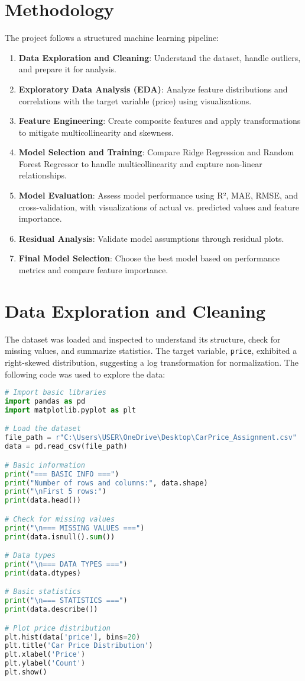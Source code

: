 \documentclass[12pt]{article}
\begin{document}
\section{Methodology}
The project follows a structured machine learning pipeline:
\begin{enumerate}
    \item \textbf{Data Exploration and Cleaning}: Understand the dataset, handle outliers, and prepare it for analysis.
    \item \textbf{Exploratory Data Analysis (EDA)}: Analyze feature distributions and correlations with the target variable (price) using visualizations.
    \item \textbf{Feature Engineering}: Create composite features and apply transformations to mitigate multicollinearity and skewness.
    \item \textbf{Model Selection and Training}: Compare Ridge Regression and Random Forest Regressor to handle multicollinearity and capture non-linear relationships.
    \item \textbf{Model Evaluation}: Assess model performance using R², MAE, RMSE, and cross-validation, with visualizations of actual vs. predicted values and feature importance.
    \item \textbf{Residual Analysis}: Validate model assumptions through residual plots.
    \item \textbf{Final Model Selection}: Choose the best model based on performance metrics and compare feature importance.
\end{enumerate}

\section{Data Exploration and Cleaning}
The dataset was loaded and inspected to understand its structure, check for missing values, and summarize statistics. The target variable, \texttt{price}, exhibited a right-skewed distribution, suggesting a log transformation for normalization. The following code was used to explore the data:

\begin{lstlisting}[language=Python, caption=Initial Data Exploration Code]
# Import basic libraries
import pandas as pd
import matplotlib.pyplot as plt

# Load the dataset
file_path = r"C:\Users\USER\OneDrive\Desktop\CarPrice_Assignment.csv"
data = pd.read_csv(file_path)

# Basic information
print("=== BASIC INFO ===")
print("Number of rows and columns:", data.shape)
print("\nFirst 5 rows:")
print(data.head())

# Check for missing values
print("\n=== MISSING VALUES ===")
print(data.isnull().sum())

# Data types
print("\n=== DATA TYPES ===")
print(data.dtypes)

# Basic statistics
print("\n=== STATISTICS ===")
print(data.describe())

# Plot price distribution
plt.hist(data['price'], bins=20)
plt.title('Car Price Distribution')
plt.xlabel('Price')
plt.ylabel('Count')
plt.show()
\end{lstlisting}
\end{document}

